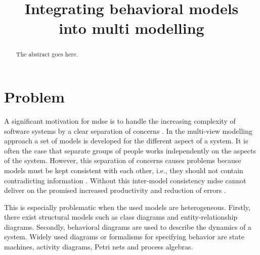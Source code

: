 \documentclass[conference]{IEEEtran}
\begin{document}
\title{Integrating behavioral models\\ into multi modelling}

\author{
}


\maketitle

\begin{abstract}
The abstract goes here.
\end{abstract}


\IEEEpeerreviewmaketitle



\section{Problem}
A significant motivation for \gls{mdse} is to handle the increasing complexity of software systems by a clear separation of concerns \cite{franceModeldrivenDevelopmentComplex2007}.
In the multi-view modelling approach a set of models is developed for the different aspect of a system.
It is often the case that separate groups of people works independently on the aspects of the system.
However, this separation of concerns causes problems because models must be kept consistent with each other, i.e., they should not contain contradicting information \cite{cicchettiMultiviewApproachesSoftware2019}.
Without this inter-model consistency \gls{mdse} cannot deliver on the promised increased productivity and reduction of errors \cite{brambillaModeldrivenSoftwareEngineering2017}.

This is especially problematic when the used models are heterogeneous.
Firstly, there exist structural models such as class diagrams and entity-relationship diagrams.
Secondly, behavioral diagrams are used to describe the dynamics of a system.
Widely used diagrams or formalisms for specifying behavior are state machines, activity diagrams, Petri nets and process algebras.
\end{document}
